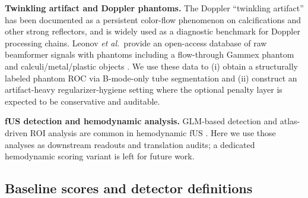\documentclass[11pt]{article}
\begin{document}
\textbf{Twinkling artifact and Doppler phantoms.} The Doppler ``twinkling artifact'' has been documented as a persistent color-flow phenomenon on calcifications and other strong reflectors, and is widely used as a diagnostic benchmark for Doppler processing chains. Leonov \emph{et al.}\ provide an open-access database of raw beamformer signals with phantoms including a flow-through Gammex phantom and calculi/metal/plastic objects \cite{LeonovTwinklingDD2021}. We use these data to (i) obtain a structurally labeled phantom ROC via B-mode-only tube segmentation and (ii) construct an artifact-heavy regularizer-hygiene setting where the optional penalty layer is expected to be conservative and auditable.

\textbf{fUS detection and hemodynamic analysis.} GLM-based detection and atlas-driven ROI analysis are common in hemodynamic fUS \cite{Demeneglmband2016,UrbanWholeBrain2015}. Here we use those analyses as downstream readouts and translation audits; a dedicated hemodynamic scoring variant is left for future work.
\fi

\subsection{Baseline scores and detector definitions}
\end{document}
